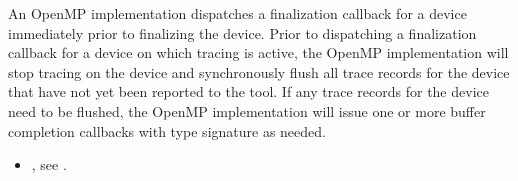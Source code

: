 \descr

An OpenMP implementation dispatches a finalization callback for a
device immediately prior to finalizing the device. Prior to dispatching
a finalization callback for a device on which tracing is active,
the OpenMP implementation will stop tracing on the device and
synchronously flush all trace records for the device 
that have not yet been reported to the tool. 
If any trace records for the device need to be flushed,
the OpenMP implementation will issue one or more
buffer completion callbacks with type signature 
as needed.

\crossreferences
\begin{itemize}
\item {}, see
  .
\end{itemize}
